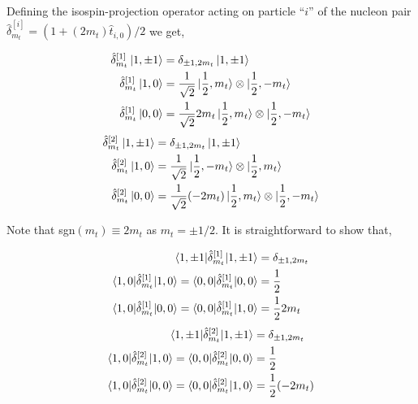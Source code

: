 \documentclass[10pt]{article}
\begin{document}
Defining the isospin-projection operator acting on particle ``$i$'' of the 
nucleon pair $ \hat{\delta}_{m_t}^{[i]} = ( 1 + (2 m_t) \hat{t}_{i,0})/2$ we 
get,
\begin{multicols}{2}
\noindent
\begin{align*}
	\hat{\delta}_{m_t}^{[1]} \ket{ 1, \pm 1} &= \delta_{\pm 1,2m_t}  \ket{ 
1, \pm 1}  \\
	\hat{\delta}_{m_t}^{[1]} \ket{ 1,0} &= \frac{1}{\sqrt{2}} \ket{ 
\frac{1}{2}, m_t} \otimes \ket{ \frac{1}{2}, -m_t} \\
	\hat{\delta}_{m_t}^{[1]} \ket{ 0,0} &= \frac{1}{\sqrt{2}} 2 m_t \ket{ 
\frac{1}{2}, m_t} \otimes \ket{ \frac{1}{2}, -m_t}
\end{align*}
\begin{align*}
	\hat{\delta}_{m_t}^{[2]} \ket{ 1, \pm 1} &= \delta_{\pm 1,2m_t}  \ket{ 
1, \pm 1}  \\
	\hat{\delta}_{m_t}^{[2]} \ket{ 1,0} &= \frac{1}{\sqrt{2}} \ket{ 
\frac{1}{2}, -m_t} \otimes \ket{ \frac{1}{2}, m_t} \\
	\hat{\delta}_{m_t}^{[2]} \ket{ 0,0} &= \frac{1}{\sqrt{2}} (-2 m_t) 
\ket{ \frac{1}{2}, m_t} \otimes \ket{ \frac{1}{2}, -m_t}
\end{align*}
\end{multicols}
Note that sgn$(m_t) \equiv 2m_t$ as $m_t = \pm 1/2$.
It is straightforward to show that,
\begin{multicols}{2}
\noindent
\begin{align*}
	\braket{ 1, \pm 1 | \hat{\delta}_{m_t}^{[1]} | 1, \pm 1} &= \delta_{\pm 
1,2m_t}  \\
	\braket{ 1,0 | \hat{\delta}_{m_t}^{[1]} | 1,0} = \braket{ 0,0 | 
\hat{\delta}_{m_t}^{[1]} | 0,0} &=  \frac{1}{2} \\
	\braket{ 1,0 | \hat{\delta}_{m_t}^{[1]} | 0,0} = \braket{ 0,0 | 
\hat{\delta}_{m_t}^{[1]} | 1,0} &=  \frac{1}{2} 2 m_t
\end{align*}
\begin{align*}
	\braket{ 1, \pm 1 | \hat{\delta}_{m_t}^{[2]} | 1, \pm 1} &= \delta_{\pm 
1,2m_t}  \\
	\braket{ 1,0 | \hat{\delta}_{m_t}^{[2]} | 1,0} = \braket{ 0,0 | 
\hat{\delta}_{m_t}^{[2]} | 0,0} &=  \frac{1}{2} \\
	\braket{ 1,0 | \hat{\delta}_{m_t}^{[2]} | 0,0} = \braket{ 0,0 | 
\hat{\delta}_{m_t}^{[2]} | 1,0} &=  \frac{1}{2} (-2 m_t) 
\end{align*}
\end{multicols}
\end{document}
